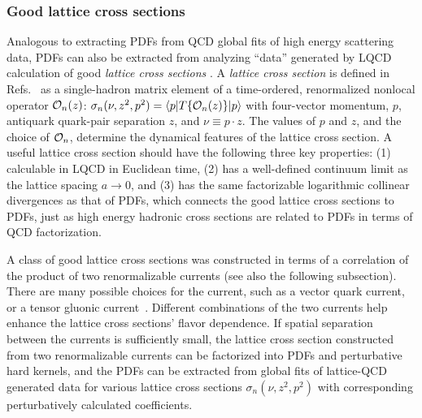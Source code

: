 \subsubsection{Good lattice cross sections}
Analogous to extracting PDFs from QCD global fits of high energy scattering data, PDFs can also be extracted from analyzing ``data'' generated by LQCD calculation of good {\it lattice cross sections} \cite{Ma:2014jla,Ma:2014jga}. A {\it lattice cross section} is defined in Refs.~\cite{ Ma:2014jla,Ma:2014jga} as a single-hadron matrix element of a time-ordered, renormalized nonlocal operator ${\cal O}_n(z)$: ${\sigma}_{n}(\nu,z^2,p^2)=\langle p| {T}\{{\cal O}_n({z})\}|p\rangle$ with four-vector momentum, $p$, antiquark quark-pair separation $z$, and $\nu\equiv p\cdot z$. The values of $p$ and $z$, and the choice of ${\cal O}_n$, determine the dynamical features of the lattice cross section. A useful lattice cross section should have the following three key properties: (1) calculable in LQCD in Euclidean time, (2) has a well-defined continuum limit as the lattice spacing $a\to 0$, and (3) has the same factorizable logarithmic collinear divergences as that of PDFs, which connects the good lattice cross sections to PDFs, just as high energy hadronic cross sections are related to PDFs in terms of QCD factorization.  

A class of { good} lattice cross sections was constructed in terms of a correlation of the product of two {renormalizable} currents (see also the following subsection).  There are many possible choices for the current, such as a vector quark current, or a tensor gluonic current~\cite{Ma:2017pxb}.  Different combinations of the two currents help enhance the lattice cross sections' flavor dependence.  If spatial separation between the currents is sufficiently small, the lattice cross section constructed from two renormalizable currents can be factorized into PDFs and perturbative hard kernels\cite{Ma:2017pxb},
and the PDFs can be extracted from global fits of lattice-QCD generated data for various lattice cross sections $\sigma_{n}(\nu,z^2,p^2)$ with corresponding perturbatively calculated coefficients.


